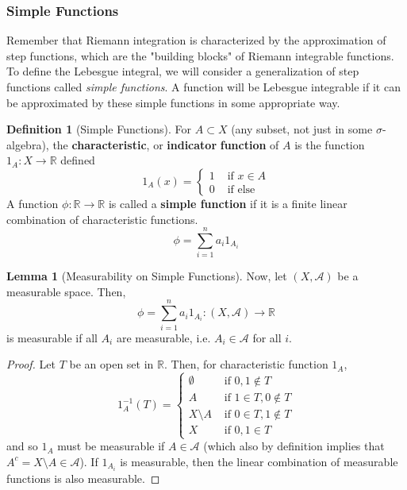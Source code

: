 \documentclass{article}
\theoremstyle{definition}
\newtheorem{lemma}[theorem]{Lemma}
\theoremstyle{remark}
\theoremstyle{definition}
\newtheorem{definition}{Definition}[section]
\begin{document}
\subsubsection{Simple Functions}

Remember that Riemann integration is characterized by the approximation of step functions, which are the "building blocks" of Riemann integrable functions. To define the Lebesgue integral, we will consider a generalization of step functions called \textit{simple functions}. A function will be Lebesgue integrable if it can be approximated by these simple functions in some appropriate way. 

\begin{definition}[Simple Functions]
For $A \subset X$ (any subset, not just in some $\sigma$-algebra), the \textbf{characteristic}, or \textbf{indicator} \textbf{function} of $A$ is the function $1_A : X \longrightarrow \mathbb{R}$ defined 
\[1_A (x) = \begin{cases} 1 & \text{ if } x \in A \\ 0 & \text{ if else} \end{cases}\]
A function $\phi: \mathbb{R} \longrightarrow \mathbb{R}$ is called a \textbf{simple function} if it is a finite linear combination of characteristic functions. 
\[\phi = \sum_{i=1}^n a_i 1_{A_i}\]
\end{definition}

\begin{lemma}[Measurability on Simple Functions]
Now, let $(X, \mathcal{A})$ be a measurable space. Then, 
\[\phi = \sum_{i=1}^n a_i 1_{A_i} : (X, \mathcal{A}) \longrightarrow \mathbb{R}\]
is measurable if all $A_i$ are measurable, i.e. $A_i \in \mathcal{A}$ for all $i$. 
\end{lemma}
\begin{proof}
Let $T$ be an open set in $\mathbb{R}$. Then, for characteristic function $1_A$, 
\[1_A^{-1} (T) = \begin{cases} 
\emptyset & \text{ if } 0, 1 \not\in T \\
A & \text{ if } 1 \in T, 0 \not\in T \\
X \setminus A & \text{ if } 0 \in T, 1 \not\in T \\
X & \text{ if } 0, 1 \in T
\end{cases}\]
and so $1_A$ must be measurable if $A \in \mathcal{A}$ (which also by definition implies that $A^c = X \setminus A \in \mathcal{A}$). If $1_{A_i}$ is measurable, then the linear combination of measurable functions is also measurable. 
\end{proof}
\end{document}
